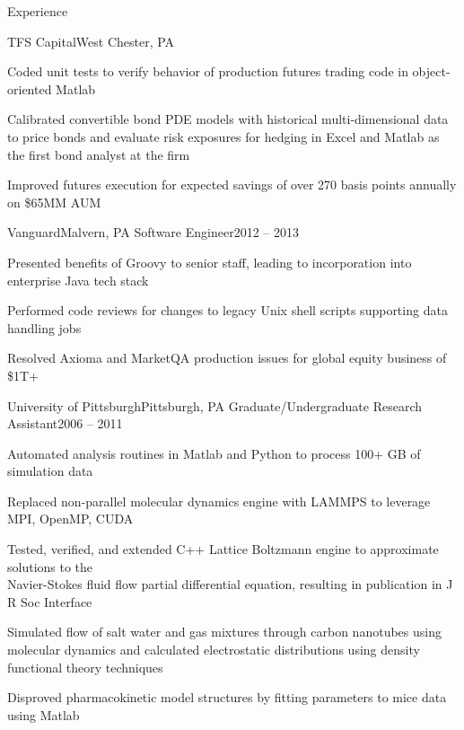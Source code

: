 \documentclass{resume}
\begin{document}
\begin{rSection}{Experience}
\begin{rSubsection}{TFS Capital}{West Chester, PA}
\item Coded unit tests to verify behavior of production futures
trading code in object-oriented Matlab
\item Calibrated convertible bond PDE models with historical
multi-dimensional data to price bonds and evaluate risk exposures
for hedging in Excel and Matlab as the first bond analyst
at the firm
\item Improved futures execution for expected savings of over
270 basis points annually on \$65MM AUM

\end{rSubsection}


\begin{rSubsection}{Vanguard}{Malvern, PA}
{Software Engineer}{2012 -- 2013}

\item Presented benefits of Groovy to senior staff, leading to
incorporation into enterprise Java tech stack
\item Performed code reviews for changes to legacy Unix shell
scripts supporting data handling jobs
\item Resolved Axioma and MarketQA production issues for global
equity business of \$1T+

\end{rSubsection}


\begin{rSubsection}{University of Pittsburgh}{Pittsburgh, PA}
{Graduate\slash Undergraduate Research Assistant}{2006 -- 2011}

\item Automated analysis routines in Matlab and Python
to process 100+ GB of simulation data
\item Replaced non-parallel molecular dynamics engine
with LAMMPS to leverage MPI, OpenMP, CUDA
\item Tested, verified, and extended C++ Lattice Boltzmann engine
to approximate solutions to the \\ Navier-Stokes fluid flow
partial differential equation, resulting in publication in J R
Soc Interface
\item Simulated flow of salt water and gas mixtures
through carbon nanotubes using molecular dynamics and
calculated electrostatic distributions using density
functional theory techniques
\item Disproved pharmacokinetic model structures by fitting
parameters to mice data using Matlab

\end{rSubsection}

\end{rSection}
\end{document}
